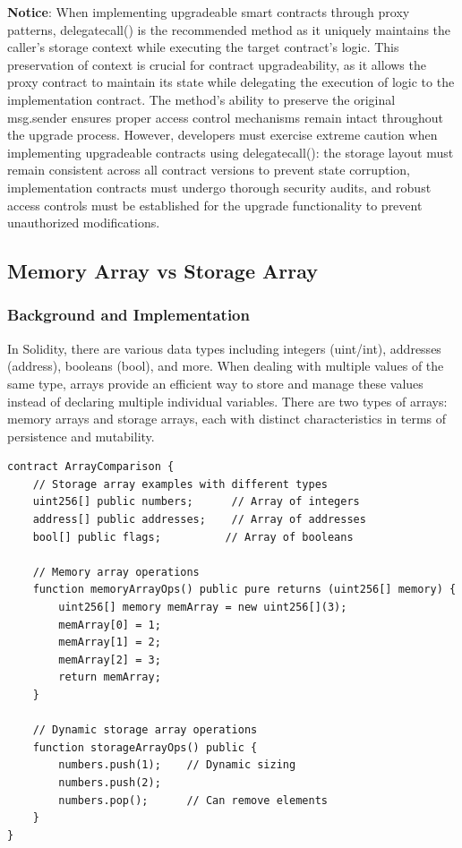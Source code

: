 \documentclass[conference]{IEEEtran}
\begin{document}
\textbf{Notice}: When implementing upgradeable smart contracts through proxy patterns, delegatecall() is the recommended method as it uniquely maintains the caller's storage context while executing the target contract's logic. This preservation of context is crucial for contract upgradeability, as it allows the proxy contract to maintain its state while delegating the execution of logic to the implementation contract. The method's ability to preserve the original msg.sender ensures proper access control mechanisms remain intact throughout the upgrade process. However, developers must exercise extreme caution when implementing upgradeable contracts using delegatecall(): the storage layout must remain consistent across all contract versions to prevent state corruption, implementation contracts must undergo thorough security audits, and robust access controls must be established for the upgrade functionality to prevent unauthorized modifications.

\vspace{1em}
\subsection{Memory Array vs Storage Array}

\subsubsection{Background and Implementation}
In Solidity, there are various data types including integers (uint/int), addresses (address), booleans (bool), and more. When dealing with multiple values of the same type, arrays provide an efficient way to store and manage these values instead of declaring multiple individual variables. There are two types of arrays: memory arrays and storage arrays, each with distinct characteristics in terms of persistence and mutability.

\begin{lstlisting}[style=solidity]
contract ArrayComparison {
    // Storage array examples with different types
    uint256[] public numbers;      // Array of integers
    address[] public addresses;    // Array of addresses
    bool[] public flags;          // Array of booleans
    
    // Memory array operations
    function memoryArrayOps() public pure returns (uint256[] memory) {
        uint256[] memory memArray = new uint256[](3);
        memArray[0] = 1;
        memArray[1] = 2;
        memArray[2] = 3;
        return memArray;
    }
    
    // Dynamic storage array operations
    function storageArrayOps() public {
        numbers.push(1);    // Dynamic sizing
        numbers.push(2);
        numbers.pop();      // Can remove elements
    }
}
\end{lstlisting}
\end{document}
